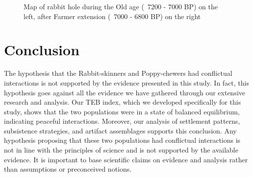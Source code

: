 \documentclass[10pt]{paper}
\begin{document}
\begin{figure}
    \centering
    \caption{Map of rabbit hole during the Old age (~7200 - 7000 BP) on the left, after Farmer extension  (~7000 - 6800 BP) on the right }
    \label{fig:twomaps}
\end{figure}

\section{Conclusion}
The hypothesis that the Rabbit-skinners and Poppy-chewers had conflictual interactions is not supported by the evidence presented in this study. In fact, this hypothesis goes against all the evidence we have gathered through our extensive research and analysis. Our TEB index, which we developed specifically for this study, shows that the two populations were in a state of balanced equilibrium, indicating peaceful interactions. Moreover, our analysis of settlement patterns, subsistence strategies, and artifact assemblages supports this conclusion. Any hypothesis proposing that these two populations had conflictual interactions is not in line with the principles of science and is not supported by the available evidence. It is important to base scientific claims on evidence and analysis rather than assumptions or preconceived notions.
\end{document}
